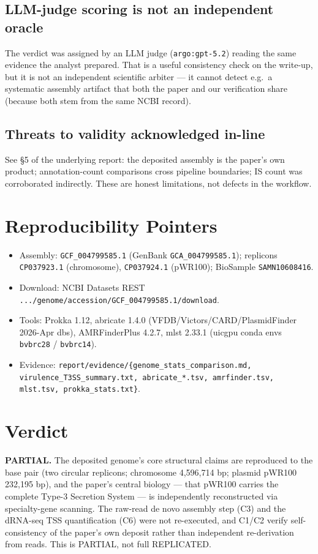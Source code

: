 \documentclass[11pt,letterpaper]{article}
\begin{document}
\subsection{LLM-judge scoring is not an independent oracle}
The verdict was assigned by an LLM judge (\texttt{argo:gpt-5.2}) reading the same evidence the analyst prepared. That is a useful consistency check on the write-up, but it is not an independent scientific arbiter --- it cannot detect e.g.\ a systematic assembly artifact that both the paper and our verification share (because both stem from the same NCBI record).

\subsection{Threats to validity acknowledged in-line}
See \S5 of the underlying report: the deposited assembly is the paper's own product; annotation-count comparisons cross pipeline boundaries; IS count was corroborated indirectly. These are honest limitations, not defects in the workflow.

\section{Reproducibility Pointers}
\begin{itemize}[nosep]
  \item Assembly: \texttt{GCF\_004799585.1} (GenBank \texttt{GCA\_004799585.1}); replicons \texttt{CP037923.1} (chromosome), \texttt{CP037924.1} (pWR100); BioSample \texttt{SAMN10608416}.
  \item Download: NCBI Datasets REST \texttt{.../genome/accession/GCF\_004799585.1/download}.
  \item Tools: Prokka 1.12, abricate 1.4.0 (VFDB/Victors/CARD/PlasmidFinder 2026-Apr dbs), AMRFinderPlus 4.2.7, mlst 2.33.1 (uicgpu conda envs \texttt{bvbrc28} / \texttt{bvbrc14}).
  \item Evidence: \texttt{report/evidence/\{genome\_stats\_comparison.md, virulence\_T3SS\_summary.txt, abricate\_*.tsv, amrfinder.tsv, mlst.tsv, prokka\_stats.txt\}}.
\end{itemize}

\section*{Verdict}
\textbf{PARTIAL.} The deposited genome's core structural claims are reproduced to the base pair (two circular replicons; chromosome 4{,}596{,}714 bp; plasmid pWR100 232{,}195 bp), and the paper's central biology --- that pWR100 carries the complete Type-3 Secretion System --- is independently reconstructed via specialty-gene scanning. The raw-read de novo assembly step (C3) and the dRNA-seq TSS quantification (C6) were not re-executed, and C1/C2 verify self-consistency of the paper's own deposit rather than independent re-derivation from reads. This is PARTIAL, not full REPLICATED.
\end{document}
